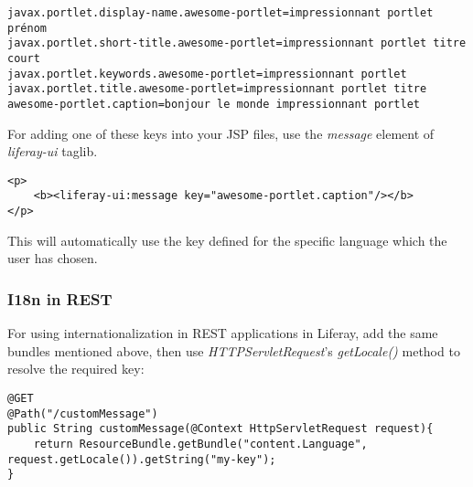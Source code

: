 \lstset{language=jsp}
\begin{lstlisting}[caption=Language\_fr.properties]
javax.portlet.display-name.awesome-portlet=impressionnant portlet prénom
javax.portlet.short-title.awesome-portlet=impressionnant portlet titre court
javax.portlet.keywords.awesome-portlet=impressionnant portlet
javax.portlet.title.awesome-portlet=impressionnant portlet titre
awesome-portlet.caption=bonjour le monde impressionnant portlet
\end{lstlisting}

For adding one of these keys into your JSP files, use the \textit{message} element of \textit{liferay-ui} taglib.

\lstset{language=jsp}
\begin{lstlisting}[caption=view.jsp]
<p>
	<b><liferay-ui:message key="awesome-portlet.caption"/></b>
</p>
\end{lstlisting}

This will automatically use the key defined for the specific language which the user has chosen.

\subsubsection{I18n in REST}

For using internationalization in REST applications in Liferay, add the same bundles mentioned above, then use \textit{HTTPServletRequest}'s \textit{getLocale()} method to resolve the required key:


\lstset{language=java}
\begin{lstlisting}[caption=RestApplication.java]
@GET
@Path("/customMessage")
public String customMessage(@Context HttpServletRequest request){
	return ResourceBundle.getBundle("content.Language", request.getLocale()).getString("my-key");
}
\end{lstlisting}